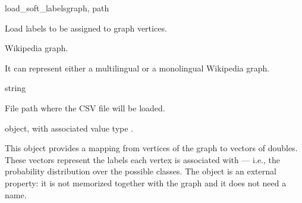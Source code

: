             \begin{independentfunctiondoc}{load\_soft\_labels}{graph, path}
                \begin{functiondescription}
                    Load  labels to be assigned to graph vertices.
                \end{functiondescription}
                
                \begin{functionparameters}
                    \item[graph] 
                    
                    Wikipedia graph.
                    
                    It can represent either a multilingual or a monolingual Wikipedia graph.
                    \item[path] string
                    
                    File path where the CSV file will be loaded.
                \end{functionparameters}
                
                \begin{functionoutput}
                     object, with associated value type .
                    
                    This object provides a mapping from vertices of the graph to vectors of doubles. These vectors represent the  labels each vertex is associated with --- i.e., the probability distribution over the possible classes. The object is an external property: it is not memorized together with the graph and it does not need a name.
                \end{functionoutput}
            \end{independentfunctiondoc}
